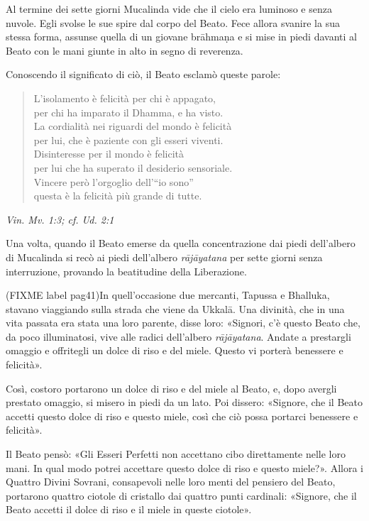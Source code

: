Al termine dei sette giorni Mucalinda vide che il cielo era luminoso e
senza nuvole. Egli svolse le sue spire dal corpo del Beato. Fece allora
svanire la sua stessa forma, assunse quella di un giovane brāhmaṇa e si
mise in piedi davanti al Beato con le mani giunte in alto in segno di
reverenza.


Conoscendo il significato di ciò, il Beato esclamò queste parole:


\begin{quote}
L’isolamento è felicità per chi è appagato, \\
per chi ha imparato il Dhamma, e ha visto. \\
La cordialità nei riguardi del mondo è felicità \\
per lui, che è paziente con gli esseri viventi. \\
Disinteresse per il mondo è felicità \\
per lui che ha superato il desiderio sensoriale. \\
Vincere però l’orgoglio dell’“io sono” \\
questa è la felicità più grande di tutte.
\end{quote}

\emph{Vin. Mv. 1:3; cf. Ud. 2:1}


Una volta, quando il Beato emerse da quella concentrazione dai piedi
dell’albero di Mucalinda si recò ai piedi dell’albero \emph{rājāyatana} per
sette giorni senza interruzione, provando la beatitudine della
Liberazione.


(FIXME label pag41)In quell’occasione due mercanti, Tapussa e Bhalluka, stavano viaggiando
sulla strada che viene da Ukkalā. Una divinità, che in una vita passata
era stata una loro parente, disse loro: «Signori, c’è questo Beato che,
da poco illuminatosi, vive alle radici dell’albero \emph{rājāyatana}. Andate
a prestargli omaggio e offritegli un dolce di riso e del miele. Questo
vi porterà benessere e felicità».


Così, costoro portarono un dolce di riso e del miele al Beato, e, dopo
avergli prestato omaggio, si misero in piedi da un lato. Poi dissero:
«Signore, che il Beato accetti questo dolce di riso e questo miele, così
che ciò possa portarci benessere e felicità».


Il Beato pensò: «Gli Esseri Perfetti non accettano cibo direttamente
nelle loro mani. In qual modo potrei accettare questo dolce di riso e
questo miele?». Allora i Quattro Divini Sovrani, consapevoli nelle loro
menti del pensiero del Beato, portarono quattro ciotole di cristallo dai
quattro punti cardinali: «Signore, che il Beato accetti il dolce di riso
e il miele in queste ciotole».



